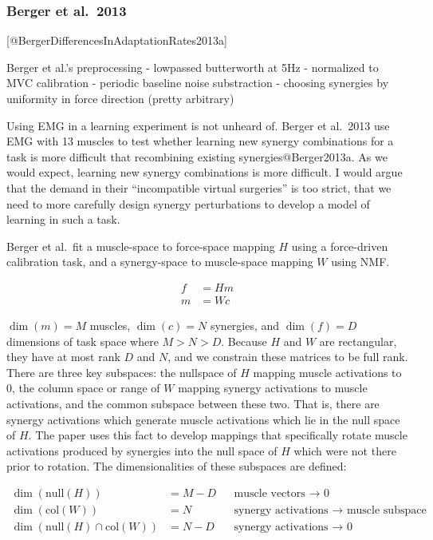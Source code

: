\subsubsection{Berger et al.~2013}\label{berger-et-al.-2013}

{[}@BergerDifferencesInAdaptationRates2013a{]}

Berger et al.'s preprocessing - lowpassed butterworth at 5Hz -
normalized to MVC calibration - periodic baseline noise substraction -
choosing synergies by uniformity in force direction (pretty arbitrary)

Using EMG in a learning experiment is not unheard of. Berger et al.~2013
use EMG with 13 muscles to test whether learning new synergy
combinations for a task is more difficult that recombining existing
synergies@Berger2013a. As we would expect, learning new synergy
combinations is more difficult. I would argue that the demand in their
``incompatible virtual surgeries'' is too strict, that we need to more
carefully design synergy perturbations to develop a model of learning in
such a task.

Berger et al.~fit a muscle-space to force-space mapping \(H\) using a
force-driven calibration task, and a synergy-space to muscle-space
mapping \(W\) using NMF.

\begin{align*}
    f &= Hm \\
    m &= Wc
\end{align*}

\(\dim(m)=M\) muscles, \(\dim(c)=N\) synergies, and \(\dim(f)=D\)
dimensions of task space where \(M>N>D\). Because \(H\) and \(W\) are
rectangular, they have at most rank \(D\) and \(N\), and we constrain
these matrices to be full rank. There are three key subspaces: the
nullspace of \(H\) mapping muscle activations to 0, the column space or
range of \(W\) mapping synergy activations to muscle activations, and
the common subspace between these two. That is, there are synergy
activations which generate muscle activations which lie in the null
space of \(H\). The paper uses this fact to develop mappings that
specifically rotate muscle activations produced by synergies into the
null space of \(H\) which were not there prior to rotation. The
dimensionalities of these subspaces are defined:

\begin{align*}
\dim(\mathrm{null}(H)) &= M - D && \text{muscle vectors $\rightarrow$ 0} \\
\dim(\mathrm{col}(W)) &= N && \text{synergy activations $\rightarrow$ muscle subspace}\\
\dim(\mathrm{null}(H)\cap\mathrm{col}(W)) &= N - D && \text{synergy activations $\rightarrow$ 0} \\
\end{align*}

